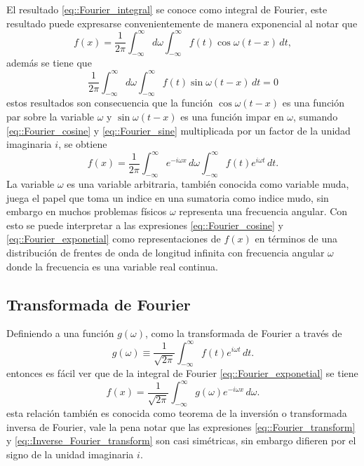 \documentclass[a4paper]{article}
\begin{document}
El resultado \ref{eq::Fourier_integral} se conoce como integral de Fourier, este resultado puede expresarse convenientemente de manera exponencial al notar que 
\begin{equation}\label{eq::Fourier_cosine}
f(x)=\frac{1}{2\pi}\int_{-\infty}^{\infty}d\omega \int_{-\infty}^\infty f(t) \cos\omega(t-x)\, dt,
\end{equation}
además se tiene que 
\begin{equation}\label{eq::Fourier_sine}
\frac{1}{2\pi}\int_{-\infty}^\infty d\omega \int_{-\infty}^\infty f(t) \sin\omega(t-x)\, dt=0
\end{equation}
estos resultados son consecuencia que la función $\cos \omega (t-x)$ es una función par sobre la variable $\omega$ y $\sin\omega(t-x)$ es una función impar en $\omega$, sumando \ref{eq::Fourier_cosine} y \ref{eq::Fourier_sine} multiplicada por un factor de la unidad imaginaria $i$, se obtiene
\begin{equation}\label{eq::Fourier_exponetial}
f(x)=\frac{1}{2\pi}\int_{-\infty}^\infty e^{-i \omega x }\,d\omega \int_{-\infty}^\infty f(t)e^{i\omega t}\,dt.
\end{equation}
La variable $\omega$ es una variable arbitraria, también conocida como variable muda, juega el papel que toma un indice en una sumatoria como indice mudo, sin embargo en muchos problemas físicos $\omega$ representa una frecuencia angular. Con esto se puede interpretar a las expresiones \ref{eq::Fourier_cosine} y \ref{eq::Fourier_exponetial} como representaciones de $f(x)$ en términos de una distribución de frentes de onda de longitud infinita con frecuencia angular $\omega$ donde la frecuencia es una variable real continua.
\subsection{Transformada de Fourier}
Definiendo a una función $g(\omega)$, como la transformada de Fourier a través de 
\begin{equation}\label{eq::Fourier_transform}
g(\omega)\equiv \frac{1}{\sqrt{2\pi}}\int_{-\infty}^\infty f(t) e ^{i\omega t }\, dt.
\end{equation}
entonces es fácil ver que de la integral de Fourier \ref{eq::Fourier_exponetial} se tiene 
\begin{equation}\label{eq::Inverse_Fourier_transform}
f(x)=\frac{1}{\sqrt{2\pi}}\int_{-\infty}^\infty g(\omega)e^{-i \omega x}\, d\omega.
\end{equation}
esta relación también es conocida como teorema de la inversión o transformada inversa de Fourier, vale la pena notar que las expresiones \ref{eq::Fourier_transform} y \ref{eq::Inverse_Fourier_transform} son casi simétricas, sin embargo difieren por el signo de la unidad imaginaria $i$.
\end{document}
